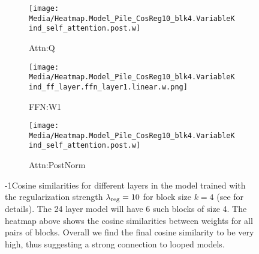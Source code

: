 \begin{figure*}[tbp]%
\centering
    \hspace{-0.1in}
    \begin{subfigure}{0.33\textwidth}
    \centering    \texttt{[image: Media/Heatmap.Model\_Pile\_CosReg10\_blk4.VariableKind\_self\_attention.post.w]}
    \caption{Attn:Q}
    \label{fig:cosines_cosreg_attn_q}
    \end{subfigure}\hfill
\centering
    \begin{subfigure}{0.33\textwidth}
    \centering    \texttt{[image: Media/Heatmap.Model\_Pile\_CosReg10\_blk4.VariableKind\_ff\_layer.ffn\_layer1.linear.w.png]}
    \caption{FFN:W1}
    \label{fig:cosines_cosreg_ffn_w1}
    \end{subfigure}\hfill
\centering
    \begin{subfigure}{0.33\textwidth}
    \centering   
     \texttt{[image: Media/Heatmap.Model\_Pile\_CosReg10\_blk4.VariableKind\_self\_attention.post.w]}
    \caption{Attn:PostNorm}
    \label{fig:cosines_cosreg_postnorm}
    \end{subfigure}\hfill
    \caption{\looseness-1Cosine similarities for different layers in the model trained with the regularization strength $\lambda_{\text{reg}}=10$ for block size $k=4$ (see  for details). The 24 layer model will have 6 such blocks of size 4. The heatmap above shows the cosine similarities between weights for all pairs of blocks. Overall we find the final cosine similarity to be very high, thus suggesting a strong connection to looped models.}
    \label{fig:cosines_cosreg}
\end{figure*}


